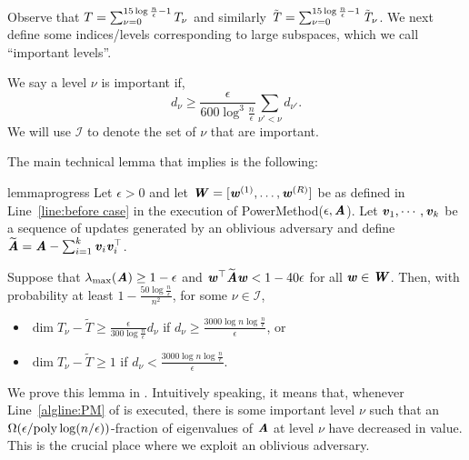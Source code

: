 Observe that $T = \sum_{\nu = 0}^{15\log\frac{n}{\eps}-1}T_\nu$ and similarly $\Ttil = \sum_{\nu = 0}^{15\log\frac{n}{\eps}-1}\Ttil_\nu$. We next define some indices/levels corresponding to large subspaces, which we call ``important levels''.
\begin{definition}[Important $\nu$]\label{def:impNu} We say a level $\nu$ is important if,
\[d_{\nu} \geq \frac{\epsilon}{600\log^3 \frac{n}{\epsilon}} \sum_{\nu'<\nu}d_{\nu'}.
\]
We will use $\mathcal{I}$ to denote the set of $\nu$ that are important.
\end{definition}
%

The main technical lemma that implies  is the following:


\begin{restatable}{lemma}{progress}\label{lem:EigenspaceChange}
	Let $\epsilon>0$ and let $\WW=[\ww^{(1)},\dots,\ww^{(R)}]$ be as defined in Line~\ref{line:before case} in the execution of {\sc PowerMethod}($\epsilon,\AA$). Let $\vv_{1},\cdots,\vv_{k}$ be a sequence of updates generated by an oblivious adversary and define $\AAtil=\AA-\sum_{i=1}^{k}\vv_{i}\vv_{i}^{\top}$.
	
	Suppose that $\lambda_{\max}(\AA)\ge 1-\epsilon$ and $\ww^{\top}\AAtil\ww<1-40\epsilon$ for all $\ww\in\WW$. Then, with probability at least $1-\frac{50\log\frac{n}{\epsilon}}{n^{2}}$, for some $\nu\in\mathcal{I}$,
	\begin{itemize}
		\item $\dim{T_{\nu}-\tilde{T}}\geq\frac{\epsilon}{300\log\frac{n}{\epsilon}}d_{\nu}$ if $d_{\nu}\geq\frac{3000\log n\log\frac{n}{\epsilon}}{\epsilon}$, or
		\item $\dim{T_{\nu}-\tilde{T}}\geq1$ if $d_{\nu}<\frac{3000\log n\log\frac{n}{\epsilon}}{\epsilon}$.
	\end{itemize}
\end{restatable}


We prove this lemma in . Intuitively speaking, it means that, whenever  Line~\ref{algline:PM} of  is executed, there is some important level $\nu$ such that an $\Omega(\eps/\poly \log(n/\eps))$-fraction of eigenvalues of $\AA$ at level $\nu$ have decreased in value. This is the crucial place where we exploit an oblivious adversary.

